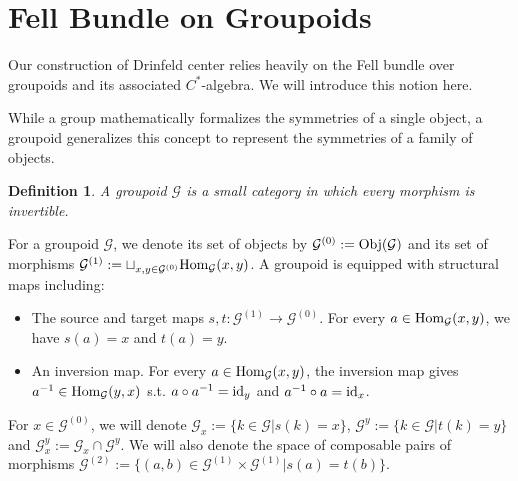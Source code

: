\documentclass[a4paper,11pt]{article}
\newtheorem{defn}[lemma]{Definition}
\def\CG{\mathcal{G}}
\begin{document}
\section{Fell Bundle on Groupoids}\label{app:fellbundle}
Our construction of Drinfeld center relies heavily on the Fell bundle over groupoids and its associated $C^*$-algebra. We will introduce this notion here.

While a group mathematically formalizes the symmetries of a single object, a groupoid generalizes this concept to represent the symmetries of a family of objects.
\begin{defn}
    A groupoid $\mathcal{G}$ is a small category in which every morphism is invertible.
\end{defn}

For a groupoid $\CG$, we denote its set of objects by $\CG^{(0)} := {\rm Obj}(\CG)$ and its set of morphisms $\CG^{(1)}:= \sqcup_{x,y\in \CG^{(0)}} {\rm Hom}_\CG (x,y) $. A groupoid is equipped with structural maps including:
\begin{itemize}
    \item The source and target maps $s, t: \mathcal{G}^{(1)} \to \mathcal{G}^{(0)}$. For every $a \in {\rm Hom}_\CG (x,y)$, we have $s(a) = x$ and $t(a) = y$.
    \item An inversion map. For every $a \in {\rm Hom}_\CG (x,y)$, the inversion map gives $a^{-1}\in {\rm Hom}_\CG (y,x)$ s.t. $a\circ a^{-1} = {\rm id}_y$ and $a^{-1}\circ a  = {\rm id}_x$.
\end{itemize} 
For $x\in \CG^{(0)}$, we will denote $\CG_x:=\{ k\in \CG | s(k) = x \}$, $\CG^y :=\{ k\in\CG | t(k) = y  \}$ and $\CG_x^y :=  \CG_x\cap \CG^y$. We will also denote the space of composable pairs of morphisms $\CG^{(2)} := \{  (a,b)\in \CG^{(1)}\times \CG^{(1)} | s(a) = t(b) \}$.
\end{document}
